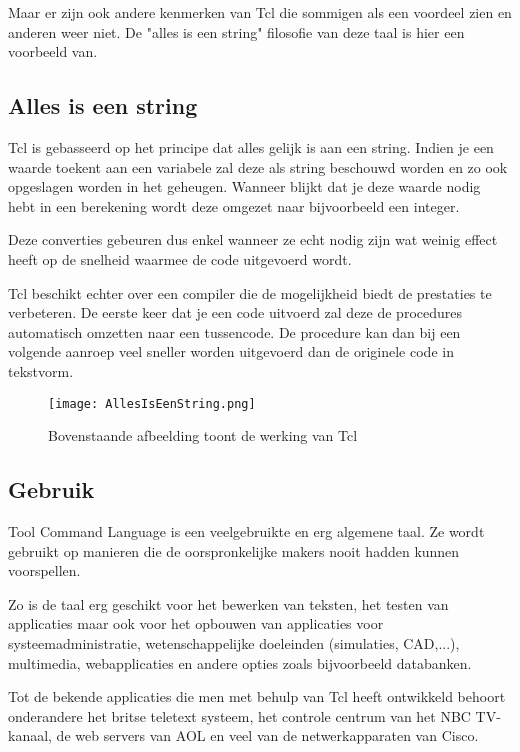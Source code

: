 \documentclass{article}
\begin{document}
\begin{flushleft}
Maar er zijn ook andere kenmerken van Tcl die sommigen als een voordeel zien en anderen weer niet. De "alles is een string" filosofie van deze taal is hier een voorbeeld van.\\
\subsection{Alles is een string}
Tcl is gebasseerd op het principe dat alles gelijk is aan een string. Indien je een waarde toekent aan een variabele zal deze als string beschouwd worden en zo ook opgeslagen worden in het geheugen. Wanneer blijkt dat je deze waarde nodig hebt in een berekening wordt deze omgezet naar bijvoorbeeld een integer.\medskip

Deze converties gebeuren dus enkel wanneer ze echt nodig zijn wat weinig effect heeft op de snelheid waarmee de code uitgevoerd wordt.\medskip

Tcl beschikt echter over een compiler die de mogelijkheid biedt de prestaties te verbeteren. De eerste keer dat je een code uitvoerd zal deze de procedures automatisch omzetten naar een tussencode. De procedure kan dan bij een volgende aanroep veel sneller worden uitgevoerd dan de originele code in tekstvorm.\medskip

\begin{figure}[htp]
\centering
\texttt{[image: AllesIsEenString.png]}
\caption[Alles is een string]{Bovenstaande afbeelding toont de werking van Tcl}
\label{}
\end{figure}

\subsection{Gebruik}
Tool Command Language is een veelgebruikte en erg algemene taal. Ze wordt gebruikt op manieren die de oorspronkelijke makers nooit hadden kunnen voorspellen.\medskip

Zo is de taal erg geschikt voor het bewerken van teksten, het testen van applicaties maar ook voor het opbouwen van applicaties voor systeemadministratie, wetenschappelijke doeleinden (simulaties, CAD,...), multimedia, webapplicaties en andere opties zoals bijvoorbeeld databanken.\medskip

Tot de bekende applicaties die men met behulp van Tcl heeft ontwikkeld behoort onderandere het britse teletext systeem, het controle centrum van het NBC TV-kanaal, de web servers van AOL en veel van de netwerkapparaten van Cisco.\medskip


\end{flushleft}
\end{document}
